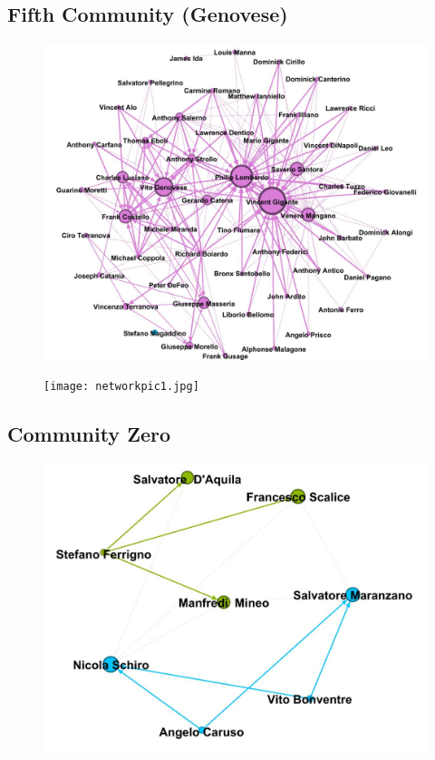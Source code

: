\documentclass{article}
\begin{document}
\textcolor{Titoli}{\subsection{Fifth Community (Genovese)}}
\begin{figure}[h!]
\vspace{35pt}
\centering
\includegraphics[width=550pt]{genovesemodule.JPG}
\advance\leftskip-2.5cm
\end{figure}
\newpage



\begin{figure}[t!]
\vspace{-250pt}
\centering
\texttt{[image: networkpic1.jpg]}
\advance\leftskip-3.52cm
\hypertarget{extramodule}{}
\end{figure}


\textcolor{Titoli}{\subsection{Community Zero}}
\begin{figure}[h!]
\vspace{15pt}
\centering
\includegraphics[width=500pt]{extramodule2.JPG}
\advance\leftskip-2cm
\end{figure}
\end{document}
